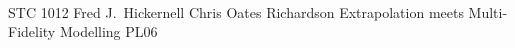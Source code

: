 	\\\hline
	{STC 1012}	%
	{Fred J.\ Hickernell}		%
	{Chris Oates}	%
	{Richardson Extrapolation meets Multi-Fidelity Modelling}		%
	{PL06}			%
	\\\hline
